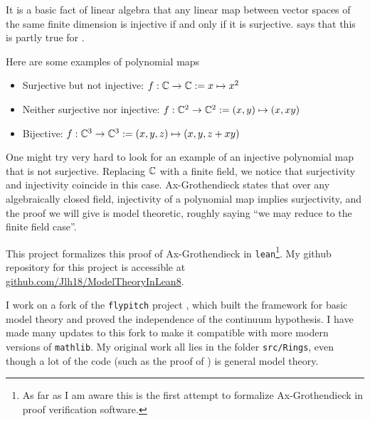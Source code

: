 It is a basic fact of linear algebra that any linear map
between vector spaces of the same finite dimension is
injective if and only if it is surjective.
 says that this is
partly true for .

Here are some examples of polynomial maps
\begin{itemize}
  \item Surjective but not injective: $f : \mathbb{C} \to \mathbb{C} := x \mapsto x^{2}$
  \item Neither surjective nor injective:
      $f : \mathbb{C}^{2} \to \mathbb{C}^{2} := (x,y) \mapsto (x,xy)$
  \item Bijective:
      $f : \mathbb{C}^{3} \to \mathbb{C}^{3} := (x,y,z) \mapsto ( x , y , z + xy )$
\end{itemize}

One might try very hard to look for an example of an injective polynomial map
that is not surjective.
Replacing $\mathbb{C}$ with a finite field, we notice that
surjectivity and injectivity coincide in this case.
Ax-Grothendieck states that over any algebraically closed field,
injectivity of a polynomial map implies surjectivity,
and the proof we will give is model theoretic,
roughly saying ``we may reduce to the finite field case''.

This project formalizes this proof of Ax-Grothendieck in \texttt{lean}\footnote{
  As far as I am aware this is the first attempt to formalize Ax-Grothendieck in
  proof verification software. }.
My github repository for this project is accessible at
\url{github.com/Jlh18/ModelTheoryInLean8}.

I work on a fork of the \texttt{flypitch} project \cite{flypitch},
which built the framework for basic model theory and proved the
independence of the continuum hypothesis.
I have made many updates to this fork to make it compatible with
more modern versions of \texttt{mathlib}.
My original work all lies in the folder \texttt{src/Rings},
even though a lot of the code (such as the proof of )
is general model theory.

